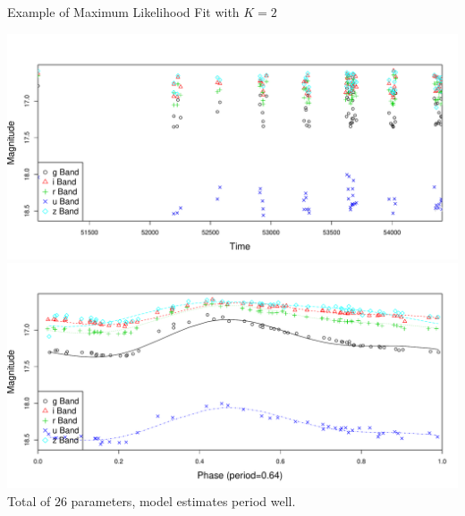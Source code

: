 \documentclass[12pt]{beamer}
\begin{document}
\begin{frame}{Example of Maximum Likelihood Fit with $K=2$}

\vspace{-.1in}

\begin{center}
\includegraphics[scale=.25]{figs/rrlyrae_nomodel_fit.pdf}\\
\includegraphics[scale=.25]{figs/rrlyrae_model_fit.pdf}\\
Total of $26$ parameters, model estimates period well.
\end{center}

\end{frame}
\end{document}
